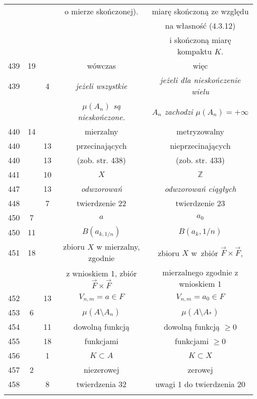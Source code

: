 \documentclass[a4paper,11pt]{article}
\begin{document}
\begin{center}
\begin{tabular}{|c|c|c|c|c|}
    & & & o mierze skończonej). & miarę skończoną ze względu \\
    & & & & na własność (4.3.12) \\
    & & & & i skończoną miarę kompaktu $K$. \\
    439 & 19 & & wówczas & więc \\
    439 & & 4 & \emph{jeżeli wszystkie} & \emph{jeżeli dla
                                          nieskończenie wielu} \\
    & & & \emph{$\mu( A_{ n } )$ są nieskończone.}
           & \emph{$A_{ n }$ zachodzi $\mu( A_{ n } ) = +\infty$} \\
    440 & 14 & & mierzalny & metryzowalny \\
    440 & & 13 & przecinających & nieprzecinających \\
    440 & & 13 & (zob. str. 438) & (zob. str. 433) \\
    441 & & 10 & $X$ & $\mathbb{Z}$ \\
    447 & & 13 & \emph{odwzorowań} & \emph{odwzorowań ciągłych} \\
    448 & & 7 & twierdzenie 22 & twierdzenie 23 \\
    450 & 7 & & $a$ & $a_{ 0 }$ \\
    450 & 11 & & $B( a_{ k, 1/n } )$ & $B( a_{ k }, 1/n )$ \\
    451 & 18 & & zbioru $X$ w mierzalny, zgodnie
           & zbioru $X$ w~zbiór $\vec{ F } \times \vec{ F }$, \\
    & & & z wnioskiem 1, zbiór $\vec{ F } \times \vec{ F }$
           & mierzalnego zgodnie z wnioskiem 1 \\
    452 & & 13 & $V_{ n, m } = a \in F$ & $V_{ n, m } = a_{ 0 } \in F$ \\
    453 & 6 & & $\mu( A \setminus A_{ n } )$
           & $\mu( A \setminus A_{ * } )$ \\
    454 & & 11 & dowolną funkcją & dowolną funkcją $\geq 0$ \\
    455 & & 18 & funkcjami & funkcjami $\geq 0$ \\
    456 & & 1 & $K \subset A$ & $K \subset X$ \\
    457 & 2 & & niezerowej & zerowej \\
    458 & & 8 & twierdzenia 32 & uwagi 1 do twierdzenia 20 \\
    & & & & \\ \hline
  \end{tabular}


\end{center}
\end{document}
